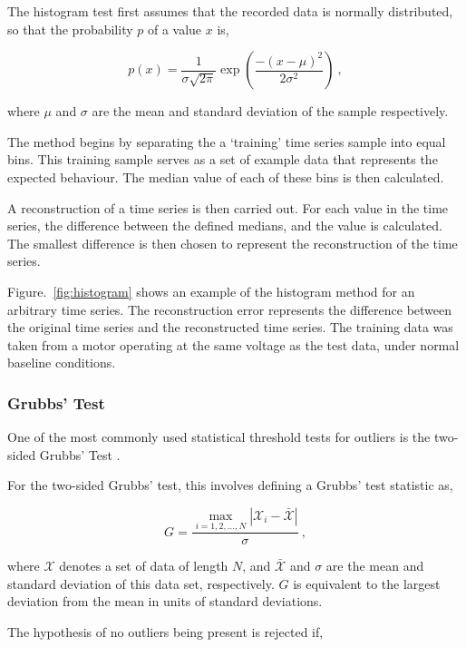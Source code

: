 The histogram test first assumes that the recorded data is normally distributed, so that the probability $p$ of a value $x$ is,

\begin{equation}
    p(x) = \dfrac{1}{\sigma \sqrt{2\pi}}\exp(\dfrac{-{(x-\mu)}^2}{2\sigma^2})~,
\end{equation}

where $\mu$ and $\sigma$ are the mean and standard deviation of the sample respectively.

The method begins by separating the a `training' time series sample into equal bins. This training sample serves as a set of example data that represents the expected behaviour. The median value of each of these bins is then calculated.

A reconstruction of a time series is then carried out. For each value in the time series, the difference between the defined medians, and the value is calculated. The smallest difference is then chosen to represent the reconstruction of the time series.

Figure.~\ref{fig:histogram} shows an example of the histogram method for an arbitrary time series. The reconstruction error represents the difference between the original time series and the reconstructed time series. The training data was taken from a motor operating at the same voltage as the test data, under normal baseline conditions.

\subsubsection{Grubbs' Test}
One of the most commonly used statistical threshold tests for outliers is the two-sided Grubbs' Test \cite{CIS-320511}.

For the two-sided Grubbs' test, this involves defining a Grubbs' test statistic as,

\begin{equation}
    G = \dfrac{\underset{i=1,2,...,N}{\max}|\mathcal{X}_i-\bar{\mathcal{X}}|}{\sigma}~,
    \label{eq:grubbs}
\end{equation}

where $\mathcal{X}$ denotes a set of data of length $N$, and $\bar{\mathcal{X}}$ and $\sigma$ are the mean and standard deviation of this data set, respectively. $G$ is equivalent to the largest deviation from the mean in units of standard deviations.  

The hypothesis of no outliers being present is rejected if,

